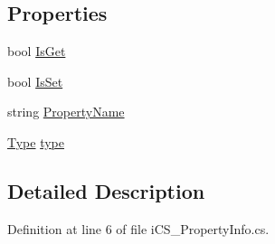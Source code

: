 \subsection*{Properties}
\begin{DoxyCompactItemize}
\item 
bool \hyperlink{classi_c_s___property_info_ace562b927e90485d7eb5eeed1a23370d}{Is\+Get}
\item 
bool \hyperlink{classi_c_s___property_info_aae3c745bfb9df05299356ef61f2e482b}{Is\+Set}
\item 
string \hyperlink{classi_c_s___property_info_ae5b920ea87a7b5f55877671d19c37053}{Property\+Name}
\item 
\hyperlink{i_c_s___object_type_enum_8cs_ae6c3dd6d8597380b56d94908eb431547aa1fa27779242b4902f7ae3bdd5c6d508}{Type} \hyperlink{classi_c_s___property_info_ad60cbf8b8f861185931d302037a3e4cf}{type}
\end{DoxyCompactItemize}


\subsection{Detailed Description}


Definition at line 6 of file i\+C\+S\+\_\+\+Property\+Info.\+cs.



